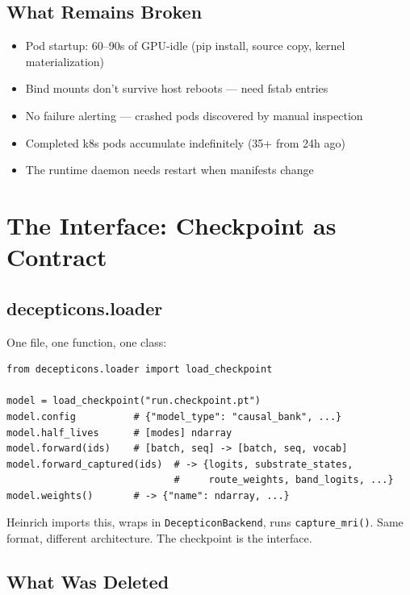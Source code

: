 \documentclass[11pt,a4paper]{report}
\begin{document}
\section{What Remains Broken}

\begin{itemize}[nosep]
\item Pod startup: 60--90s of GPU-idle (pip install, source copy, kernel materialization)
\item Bind mounts don't survive host reboots --- need fstab entries
\item No failure alerting --- crashed pods discovered by manual inspection
\item Completed k8s pods accumulate indefinitely (35+ from 24h ago)
\item The runtime daemon needs restart when manifests change
\end{itemize}

\chapter{The Interface: Checkpoint as Contract}

\section{decepticons.loader}

One file, one function, one class:

\begin{verbatim}
from decepticons.loader import load_checkpoint

model = load_checkpoint("run.checkpoint.pt")
model.config          # {"model_type": "causal_bank", ...}
model.half_lives      # [modes] ndarray
model.forward(ids)    # [batch, seq] -> [batch, seq, vocab]
model.forward_captured(ids)  # -> {logits, substrate_states,
                             #     route_weights, band_logits, ...}
model.weights()       # -> {"name": ndarray, ...}
\end{verbatim}

Heinrich imports this, wraps in \texttt{DecepticonBackend}, runs \texttt{capture\_mri()}. Same format, different architecture. The checkpoint is the interface.

\section{What Was Deleted}
\end{document}
